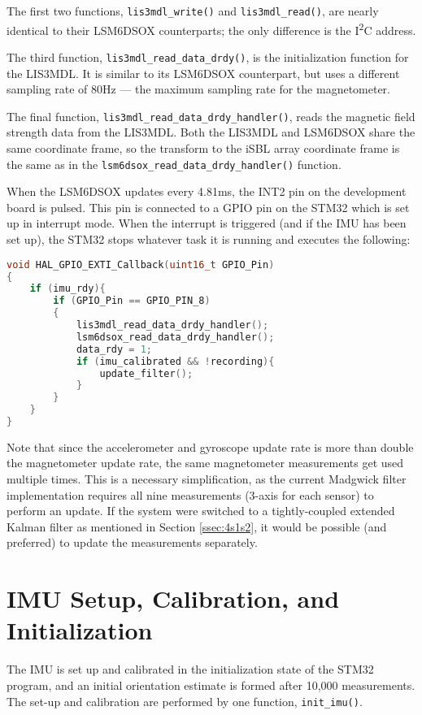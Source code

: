 \documentclass[11pt]{ucthesisCP}
\begin{document}
The first two functions, \verb|lis3mdl_write()| and \verb|lis3mdl_read()|, are nearly identical to their LSM6DSOX counterparts; the only difference is the I\textsuperscript{2}C address.

The third function, \verb|lis3mdl_read_data_drdy()|, is the initialization function for the LIS3MDL. It is similar to its LSM6DSOX counterpart, but uses a different sampling rate of 80Hz --- the maximum sampling rate for the magnetometer. 

The final function, \verb|lis3mdl_read_data_drdy_handler()|, reads the magnetic field strength data from the LIS3MDL. Both the LIS3MDL and LSM6DSOX share the same coordinate frame, so the transform to the iSBL array coordinate frame is the same as in the \verb|lsm6dsox_read_data_drdy_handler()| function.

When the LSM6DSOX updates every 4.81ms, the INT2 pin on the development board is pulsed. This pin is connected to a GPIO pin on the STM32 which is set up in interrupt mode. When the interrupt is triggered (and if the IMU has been set up), the STM32 stops whatever task it is running and executes the following:

\begin{lstlisting}[language=C++]
void HAL_GPIO_EXTI_Callback(uint16_t GPIO_Pin)
{
	if (imu_rdy){
		if (GPIO_Pin == GPIO_PIN_8)
		{
			lis3mdl_read_data_drdy_handler();
			lsm6dsox_read_data_drdy_handler();
			data_rdy = 1;
			if (imu_calibrated && !recording){
				update_filter();
			}
		}
	}
}
\end{lstlisting}

Note that since the accelerometer and gyroscope update rate is more than double the magnetometer update rate, the same magnetometer measurements get used multiple times. This is a necessary simplification, as the current Madgwick filter implementation requires all nine measurements (3-axis for each sensor) to perform an update. If the system were switched to a tightly-coupled extended Kalman filter as mentioned in Section \ref{ssec:4s1s2}, it would be possible (and preferred) to update the measurements separately.

\section{IMU Setup, Calibration, and Initialization} \label{sec:4s3}
The IMU is set up and calibrated in the initialization state of the STM32 program, and an initial orientation estimate is formed after 10,000 measurements. The set-up and calibration are performed by one function, \verb|init_imu()|.
\end{document}
